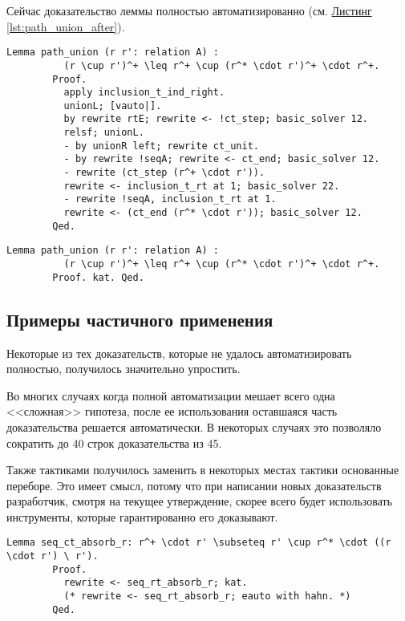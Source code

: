 \documentclass[times
              ,specification
              ,annotation
              ]{itmo-student-thesis}
\begin{document}
      Сейчас доказательство леммы полностью автоматизированно (см.
      \hyperref[lst:path_union_after]{Листинг \ref{lst:path_union_after}}).

      \begin{lstlisting}[float=false, gobble=8, label={lst:path_union_before},
        caption={Пример сложного доказательства, которое может быть полностью автоматизированно}]
        Lemma path_union (r r': relation A) :
          (r \cup r')^+ \leq r^+ \cup (r^* \cdot r')^+ \cdot r^+.
        Proof.
          apply inclusion_t_ind_right.
          unionL; [vauto|].
          by rewrite rtE; rewrite <- !ct_step; basic_solver 12.
          relsf; unionL.
          - by unionR left; rewrite ct_unit.
          - by rewrite !seqA; rewrite <- ct_end; basic_solver 12.
          - rewrite (ct_step (r^+ \cdot r')).
          rewrite <- inclusion_t_rt at 1; basic_solver 22.
          - rewrite !seqA, inclusion_t_rt at 1.
          rewrite <- (ct_end (r^* \cdot r')); basic_solver 12.
        Qed.
      \end{lstlisting}

      \begin{lstlisting}[float=false, gobble=8, label={lst:path_union_after},
        caption={Пример полностью автоматизированного доказательства}]
        Lemma path_union (r r': relation A) :
          (r \cup r')^+ \leq r^+ \cup (r^* \cdot r')^+ \cdot r^+.
        Proof. kat. Qed.
      \end{lstlisting}

    \subsection{Примеры частичного применения }
      Некоторые из тех доказательств, которые не удалось автоматизировать полностью, получилось
      значительно упростить.

      Во многих случаях когда полной автоматизации мешает всего одна <<сложная>> гипотеза,
      после ее использования оставшаяся часть доказательства решается автоматически. В некоторых
      случаях это позволяло сократить до 40 строк доказательства из 45.

      Также тактиками  получилось заменить в некоторых местах тактики основанные переборе.
      Это имеет смысл, потому что при написании новых доказательств разработчик, смотря на текущее
      утверждение, скорее всего будет использовать инструменты, которые гарантированно его доказывают.

      \begin{lstlisting}[float=false, gobble=8, label={lst:auto_replace},
        caption={Пример замены тактики основанной на переборе на \coqe{kat} (в комментариях указано
          старое доказательство)}]
        Lemma seq_ct_absorb_r: r^+ \cdot r' \subseteq r' \cup r^* \cdot ((r \cdot r') \ r').
        Proof.
          rewrite <- seq_rt_absorb_r; kat.
          (* rewrite <- seq_rt_absorb_r; eauto with hahn. *)
        Qed.
      \end{lstlisting}
\end{document}
